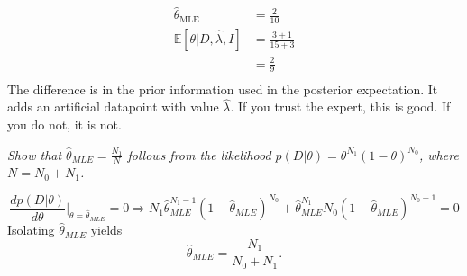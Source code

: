 \begin{example}
\begin{enumerate}
		\begin{equation}
			\begin{split}
				\hat{\theta}_{\text{MLE}} &= \frac{2}{10}\\
				\mathbb{E}[\theta|D,\hat{\lambda},I] &= \frac{3+1}{15+3}\\
				&= \frac{2}{9}\\
			\end{split}
		\end{equation}
		The difference is in the prior information used in the posterior expectation. It adds an artificial datapoint with value $\hat{\lambda}$. If you trust the expert, this is good. If you do not, it is not.
	\end{enumerate}
\end{example}

\begin{example}
	\emph{Show that $\hat{\theta}_{MLE}=\frac{N_1}{N}$ follows from the likelihood $p(D|\theta)=\theta^{N_1}(1-\theta)^{N_0}$, where $N=N_0+N_1$.}
	
	\begin{equation}
		\frac{dp(D|\theta)}{d\theta}\bigg|_{\theta=\hat{\theta}_{MLE}} =0 \Rightarrow N_1\hat{\theta}_{MLE}^{N_1-1}(1-\hat{\theta}_{MLE})^{N_0}+\hat{\theta}_{MLE}^{N_1}N_0(1-\hat{\theta}_{MLE})^{N_0-1}=0
	\end{equation}
	Isolating $\hat{\theta}_{MLE}$ yields
	\begin{equation}
		\hat{\theta}_{MLE} = \frac{N_1}{N_0+N_1}.
	\end{equation}
\end{example}

